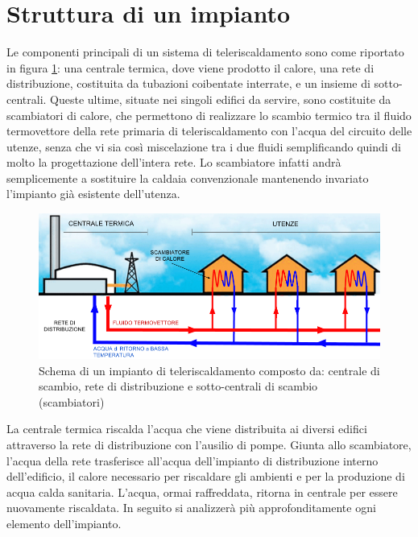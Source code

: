 \documentclass[laurea,oneside,11pt]{USiena_tesiLM}
\begin{document}
\section{Struttura di un impianto}
Le componenti principali di un sistema di teleriscaldamento sono come riportato in figura \ref{fig:schema1}: una centrale termica, dove viene prodotto il calore, una rete di distribuzione, costituita da tubazioni 
coibentate interrate, e un insieme di sotto-centrali. Queste ultime, situate nei singoli 
edifici da servire, sono costituite da scambiatori di calore, che permettono di realizzare 
lo scambio termico tra il fluido termovettore  della rete primaria di teleriscaldamento con l'acqua del circuito delle utenze, senza che vi sia così miscelazione tra i due fluidi semplificando quindi di molto la progettazione dell'intera rete. Lo scambiatore infatti andrà semplicemente a sostituire la  caldaia convenzionale mantenendo invariato l'impianto già esistente dell'utenza.

\begin{figure}[!ht]
\centering
\includegraphics[width=1.0\textwidth]{figure/schema_impianto1}
\caption{Schema di un impianto di teleriscaldamento composto da: centrale di scambio, rete di distribuzione e sotto-centrali di scambio (scambiatori)}
\label{fig:schema1}
\end{figure}

La centrale termica riscalda l'acqua che viene distribuita ai diversi edifici attraverso la rete di distribuzione con l'ausilio di pompe. Giunta allo scambiatore, l'acqua della rete trasferisce all'acqua dell'impianto di distribuzione interno dell'edificio, il calore necessario per riscaldare gli ambienti e per la produzione di acqua calda sanitaria. L'acqua, ormai raffreddata, ritorna in centrale per essere nuovamente riscaldata. 
In seguito si analizzerà più approfonditamente ogni elemento dell'impianto.
\end{document}
